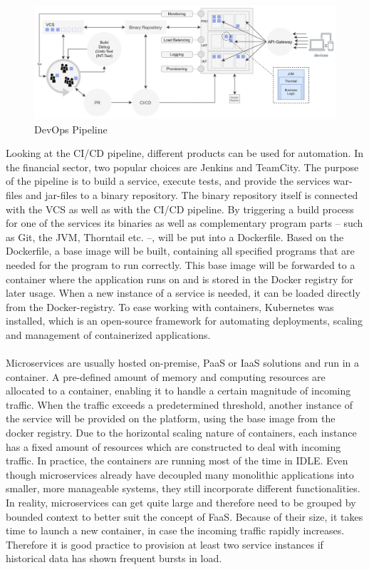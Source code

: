 \documentclass[a4paper,11pt, pagesize]{scrartcl}
\begin{document}
\begin{spacing}{1.2}
\begin{figure}[H]
\label{fig:devopsone}
\centering
\includegraphics[width=1\textwidth]{devopsone}
\caption{DevOps Pipeline}
\end{figure}
Looking at the CI/CD pipeline, different products can be used for automation. In the financial sector, two popular choices are Jenkins and TeamCity. The purpose of the pipeline is to build a service, execute tests, and provide the services war-files and jar-files to a binary repository. The binary repository itself is connected with the VCS as well as with the CI/CD pipeline. By triggering a build process for one of the services its binaries as well as complementary program parts -- such as Git, the JVM, Thorntail etc. --, will be put into a Dockerfile. Based on the Dockerfile, a base image will be built, containing all specified programs that are needed for the program to run correctly. This base image will be forwarded to a container where the application runs on and is stored in the Docker registry for later usage. When a new instance of a service is needed, it can be loaded directly from the Docker-registry. To ease working with containers, Kubernetes was installed, which is an open-source framework for automating deployments, scaling and management of containerized applications.\\\\ Microservices are usually hosted on-premise, PaaS or IaaS solutions and run in a container. A pre-defined amount of memory and computing resources are allocated to a container, enabling it to handle a certain magnitude of incoming traffic. When the traffic exceeds a predetermined threshold, another instance of the service will be provided on the platform, using the base image from the docker registry. Due to the horizontal scaling nature of containers, each instance has a fixed amount of resources which are constructed to deal with incoming traffic.  In practice, the containers are running most of the time in IDLE. Even though microservices already have decoupled many monolithic applications into smaller, more manageable systems, they still incorporate different functionalities. In reality, microservices can get quite large and therefore need to be grouped by bounded context to better suit the concept of FaaS. Because of their size, it takes time to launch a new container, in case the incoming traffic rapidly increases. Therefore it is good practice to provision at least two service instances if historical data has shown frequent bursts in load. 

\end{spacing}
\end{document}
